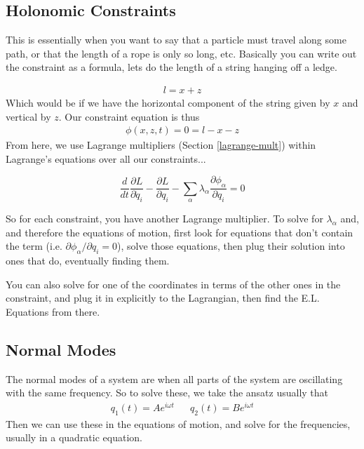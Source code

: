 




\subsection{Holonomic Constraints}
This is essentially when you want to say that a particle must travel along some path, or that the length of a rope is only so long, etc. Basically you can write out the constraint as a formula, lets do the length of a string hanging off a ledge.

\begin{align}
    l = x + z
\end{align}
Which would be if we have the horizontal component of the string given by $x$ and vertical by $z$. Our constraint equation is thus
\begin{align}
    \phi(x,z,t) = 0 = l - x - z
\end{align}
From here, we use Lagrange multipliers (Section \ref{lagrange-mult}) within Lagrange's equations over all our constraints...

$$\frac{d}{dt}\frac{\partial L}{\partial\dot{q}_i} - \frac{\partial L}{\partial q_i} - \sum_\alpha \lambda_\alpha \frac{\partial \phi_\alpha}{\partial q_i} = 0$$

So for each constraint, you have another Lagrange multiplier. To solve for $\lambda_\alpha$ and, and therefore the equations of motion, first look for equations that don't contain the term (i.e. $\partial\phi_\alpha/\partial q_i = 0$), solve those equations, then plug their solution into ones that do, eventually finding them.


You can also solve for one of the coordinates in terms of the other ones in the constraint, and plug it in explicitly to the Lagrangian, then find the E.L. Equations from there.

\subsection{Normal Modes}
The normal modes of a system are when all parts of the system are oscillating with the same frequency. So to solve these, we take the ansatz usually that
\begin{align}
    q_1(t) = Ae^{i\omega t} && q_2(t) = Be^{i\omega t}
\end{align}
Then we can use these in the equations of motion, and solve for the frequencies, usually in a quadratic equation.

